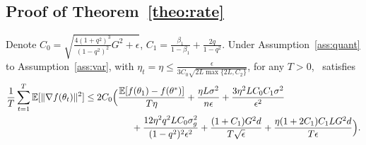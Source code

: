 \documentclass[11pt]{article}
\begin{document}
%
%
%

\subsection{Proof of Theorem~\ref{theo:rate}}\label{app:thm}

\begin{Theorem*}
Denote $C_0=\sqrt{\frac{4(1+q^2)^3}{(1-q^2)^2}G^2+\epsilon}$, $C_1=\frac{\beta_1}{1-\beta_1}+\frac{2q}{1-q^2}$. Under Assumption~\ref{ass:quant} to Assumption~\ref{ass:var}, with $\eta_t=\eta\leq \frac{\epsilon}{3C_0\sqrt{2L \max\{2L,C_2\}}}$, for any $T >0$, \algo\ satisfies
\begin{align*}
    \frac{1}{T}\sum_{t=1}^T \mathbb E[\|\nabla f(\theta_t)\|^2]
    &\leq 2C_0\Big(\frac{\mathbb E[f(\theta_1)-f(\theta^*)]}{T\eta}+\frac{\eta L \sigma^2}{n\epsilon}+\frac{3\eta^2 LC_0C_1\sigma^2}{\epsilon^2}  \\
    &\hspace{0.7in} + \frac{12\eta^2q^2LC_0\sigma_g^2}{(1-q^2)^2\epsilon^2}+\frac{ (1+C_1)G^2d}{T\sqrt\epsilon}+\frac{\eta (1+2C_1)C_1LG^2d}{T\epsilon} \Big).
\end{align*}
\end{Theorem*}
\end{document}
